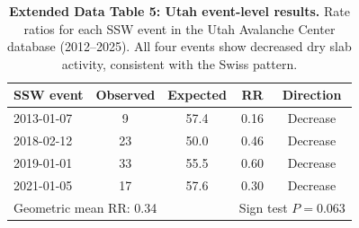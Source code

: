 \documentclass[11pt,letterpaper]{article}
\begin{document}

\begin{table}[!ht]
\centering
\caption{\textbf{Extended Data Table 5: Utah event-level results.}
Rate ratios for each SSW event in the Utah Avalanche Center database (2012--2025). All four events show decreased dry slab activity, consistent with the Swiss pattern.}
\label{tab:utah}
\small
\begin{tabular}{lcccc}
\toprule
SSW event & Observed & Expected & RR & Direction \\
\midrule
2013-01-07 & 9 & 57.4 & 0.16 & Decrease \\
2018-02-12 & 23 & 50.0 & 0.46 & Decrease \\
2019-01-01 & 33 & 55.5 & 0.60 & Decrease \\
2021-01-05 & 17 & 57.6 & 0.30 & Decrease \\
\midrule
\multicolumn{3}{l}{Geometric mean RR: 0.34} & \multicolumn{2}{l}{Sign test $P = 0.063$} \\
\bottomrule
\end{tabular}
\end{table}
\end{document}
